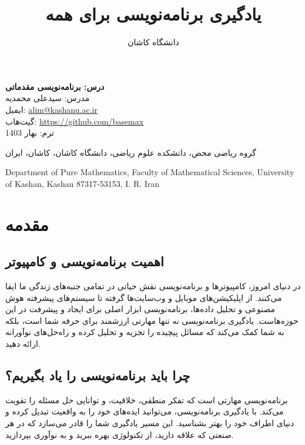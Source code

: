 \documentclass[a4paper,12pt]{article}
\begin{document}
	\title{یادگیری برنامه‌نویسی برای همه}
	\author{دانشگاه کاشان}
	\date{}
	\maketitle
	\thispagestyle{empty}
	
	\begin{center}
		\textbf{درس: برنامه‌نویسی مقدماتی}\\
		مدرس: سیدعلی محمدیه\\
		ایمیل: \href{mailto:alim@kashanu.ac.ir}{alim@kashanu.ac.ir}\\
		گیت‌هاب: \url{https://github.com/basemax}\\
		ترم: بهار 1403  
		
		\vspace{1cm}
		گروه ریاضی محض، دانشکده علوم ریاضی، دانشگاه کاشان، کاشان، ایران\\
		\begin{LTR}
			Department of Pure Mathematics, Faculty of Mathematical Sciences, University of Kashan, Kashan 87317-53153, I. R. Iran		
		\end{LTR}
	\end{center}
	
	
	\newpage
	\section*{مقدمه}
	
	\subsection*{اهمیت برنامه‌نویسی و کامپیوتر}
	در دنیای امروز، کامپیوترها و برنامه‌نویسی نقش حیاتی در تمامی جنبه‌های زندگی ما ایفا می‌کنند. از اپلیکیشن‌های موبایل و وب‌سایت‌ها گرفته تا سیستم‌های پیشرفته هوش مصنوعی و تحلیل داده‌ها، برنامه‌نویسی ابزار اصلی برای ایجاد و پیشرفت در این حوزه‌هاست. یادگیری برنامه‌نویسی نه تنها مهارتی ارزشمند برای حرفه شما است، بلکه به شما کمک می‌کند که مسائل پیچیده را تجزیه و تحلیل کرده و راه‌حل‌های نوآورانه ارائه دهید.
	
	\subsection*{چرا باید برنامه‌نویسی را یاد بگیریم؟}
	برنامه‌نویسی مهارتی است که تفکر منطقی، خلاقیت، و توانایی حل مسئله را تقویت می‌کند. با یادگیری برنامه‌نویسی، می‌توانید ایده‌های خود را به واقعیت تبدیل کرده و دنیای اطراف خود را بهتر بشناسید. این مسیر یادگیری شما را قادر می‌سازد که در هر صنعتی که علاقه دارید، از تکنولوژی بهره ببرید و به نوآوری بپردازید.
	
\end{document}
